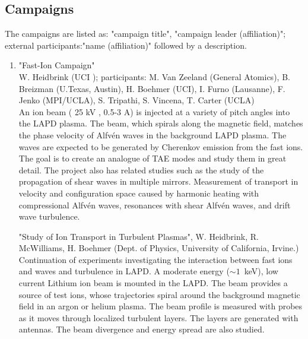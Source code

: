 \documentclass[11pt]{article}
\begin{document}
\subsection{Campaigns}
The campaigns are listed as: "campaign title", "campaign leader (affiliation)"; external participants:"name (affiliation)" followed by a description. 

\begin{enumerate}

\item "Fast-Ion Campaign"\\ W. Heidbrink (UCI ); participants: M. Van
  Zeeland (General Atomics), B. Breizman (U.Texas, Austin), H. Boehmer
  (UCI), I. Furno (Lausanne), F. Jenko (MPI/UCLA), S. Tripathi,
  S. Vincena, T. Carter (UCLA) \\ An ion beam ( 25 kV , 0.5-3 A) is
   injected at a variety of pitch angles into the LAPD plasma. The
  beam, which spirals along the magnetic field, matches the phase
  velocity of Alfv\'{e}n waves in the background LAPD plasma. The
  waves are expected to be generated by Cherenkov emission from the
  fast ions. The goal is to create an analogue of TAE modes and study
  them in great detail. The project also has related studies such
  as the study of the propagation of shear waves in multiple
  mirrors. Measurement of transport in velocity and configuration
  space caused by harmonic heating with compressional Alfv\'{e}n
  waves, resonances with shear Alfv\'{e}n waves, and drift wave
  turbulence.

  "Study of Ion Transport in Turbulent Plasmas", W. Heidbrink,
  R. McWilliams, H. Boehmer (Dept. of Physics, University of
  California, Irvine.)\\ Continuation of experiments investigating the
  interaction between fast ions and waves and turbulence in LAPD.  A
  moderate energy ($\sim 1$~keV), low current Lithium ion beam is
  mounted in the LAPD. The beam provides a source of test ions, whose
  trajectories spiral around the background
  magnetic field in an argon or helium plasma. The beam profile is
   measured with probes as it moves through localized turbulent
  layers. The layers are generated with antennas. The beam divergence
  and energy spread are also studied.



\end{enumerate}
\end{document}
